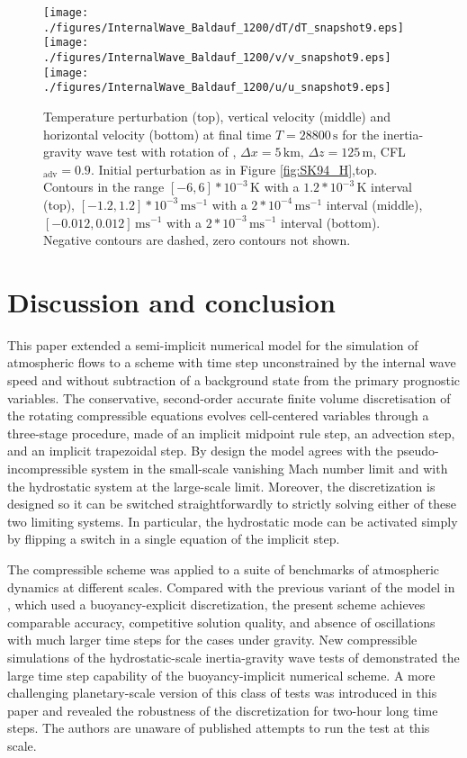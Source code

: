 \documentclass[12pt,a4paper]{article}
\theoremstyle{definition}
\begin{document}
\begin{figure}
\centering
 \texttt{[image: ./figures/InternalWave\_Baldauf\_1200/dT/dT\_snapshot9.eps]}
 \texttt{[image: ./figures/InternalWave\_Baldauf\_1200/v/v\_snapshot9.eps]}
 \texttt{[image: ./figures/InternalWave\_Baldauf\_1200/u/u\_snapshot9.eps]}
 \caption{Temperature perturbation (top), vertical velocity (middle) and horizontal velocity (bottom) at final time $T=28800\,\textrm{s}$ for the inertia-gravity wave test with rotation of \cite{BaldaufBrdar2013}, $\Delta x=5\,\textrm{km},\,\Delta z=125\,\textrm{m}$, CFL$_\textrm{adv}=0.9$. Initial perturbation as in Figure \ref{fig:SK94_H},top. Contours in the range $[-6, 6]*10^{-3}\,\textrm{K}$ with a $1.2*10^{-3}\,\textrm{K}$ interval (top), $[-1.2, 1.2]*10^{-3}\,\textrm{ms$^{-1}$}$  with a $2*10^{-4}\,\textrm{ms$^{-1}$}$ interval (middle), $[-0.012, 0.012]\,\textrm{ms$^{-1}$}$ with a $2*10^{-3}\,\textrm{ms$^{-1}$}$ interval (bottom). Negative contours are dashed, zero contours not shown.}
  \label{fig:BB13}
\end{figure}

\section{Discussion and conclusion}
\label{sec:Conclusions}	

This paper extended a semi-implicit numerical model for the simulation of atmospheric flows to a scheme with time step unconstrained by the internal wave speed and without subtraction of a background state from the primary prognostic variables. The conservative, second-order accurate finite volume discretisation of the rotating compressible equations evolves cell-centered variables through a three-stage procedure, made of an implicit midpoint rule step, an advection step, and an implicit trapezoidal step. By design the model agrees with the pseudo-incompressible system in the small-scale vanishing Mach number limit and with the hydrostatic system at the large-scale limit. Moreover, the discretization is designed so it can be switched straightforwardly to strictly solving either of these two limiting systems. In particular, the hydrostatic mode can be activated simply by flipping a switch in a single equation of the implicit step.

The compressible scheme was applied to a suite of benchmarks of atmospheric dynamics at different scales. Compared with the previous variant of the model in \cite{Benacchio2014, BenacchioEtAl2014}, which used a buoyancy-explicit discretization, the present scheme achieves comparable accuracy, competitive solution quality, and absence of oscillations with much larger time steps for the cases under gravity. New compressible simulations of the hydrostatic-scale inertia-gravity wave tests of \cite{SkamarockKlemp1994} demonstrated the large time step capability of the buoyancy-implicit numerical scheme. A more challenging planetary-scale version of this class of tests was introduced in this paper and revealed the robustness of the discretization for two-hour long time steps. The authors are unaware of published attempts to run the test at this scale. 
\end{document}
